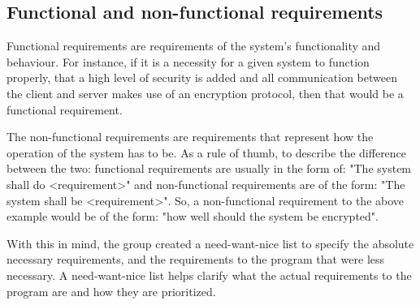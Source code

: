 \subsection{Functional and non-functional requirements}

Functional requirements are requirements of the system's functionality and behaviour. 
For instance, if it is a necessity for a given system to function properly, that
a high level of security is added and all communication between the client and 
server makes use of an encryption protocol, then that would be a functional
requirement\cite{SEF01}.

The non-functional requirements are requirements that represent how the operation 
of the system has to be. As a rule of thumb, to describe the difference between
the two: functional requirements are usually in the form of: "The system shall 
do <requirement>" and non-functional requirements are of the form: "The system
shall be <requirement>". So, a non-functional requirement to the above example 
would be of the form: "how well should the system be encrypted".

With this in mind, the group created a need-want-nice list to specify the absolute necessary
requirements, and the requirements to the program that were less necessary. A need-want-nice
list helps clarify what the actual requirements to the program are and
how they are prioritized.





